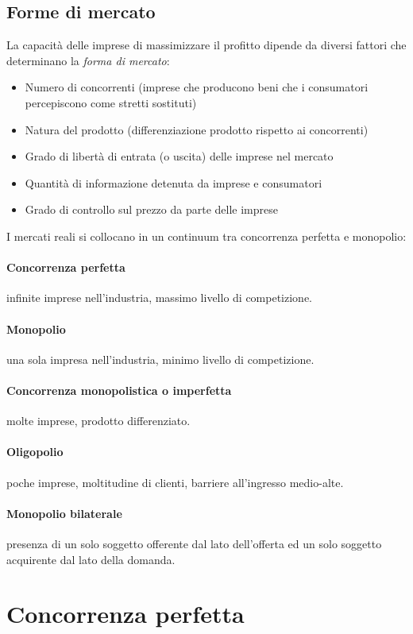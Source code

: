 \subsection{Forme di mercato}
La capacità delle imprese di massimizzare il profitto dipende da diversi fattori che determinano la \emph{forma di mercato}:
\begin{itemize}
	\item Numero di concorrenti (imprese che producono beni che i consumatori percepiscono come stretti
sostituti)
	\item Natura del prodotto (differenziazione prodotto rispetto ai concorrenti)
	\item Grado di libertà di entrata (o uscita) delle imprese nel mercato
	\item Quantità di informazione detenuta da imprese e consumatori
	\item Grado di controllo sul prezzo da parte delle imprese
\end{itemize}

I mercati reali si collocano in un continuum tra concorrenza perfetta e monopolio:
\paragraph{Concorrenza perfetta} infinite imprese nell’industria, massimo livello di competizione.
\paragraph{Monopolio} una sola impresa nell’industria, minimo livello di competizione.
\paragraph{Concorrenza monopolistica o imperfetta} molte imprese, prodotto differenziato.
\paragraph{Oligopolio} poche imprese, moltitudine di clienti, barriere all’ingresso medio-alte.
\paragraph{Monopolio bilaterale} presenza di un solo soggetto offerente dal lato dell'offerta ed un solo soggetto
acquirente dal lato della domanda.

\section{Concorrenza perfetta}

